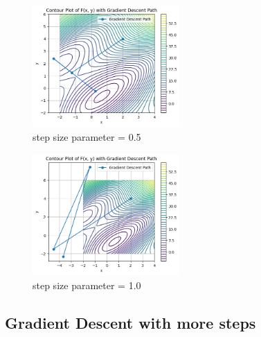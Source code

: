 \begin{multicols}{2} %
    \begin{figure}[H]
        \centering
        \includegraphics[width=0.5\textwidth]{pic/Gradient_Descent_Path_05.png}
        \caption{step size parameter = 0.5}
    \end{figure}
    \columnbreak
    \begin{figure}[H]
        \centering
        \includegraphics[width=0.5\textwidth]{pic/Gradient_Descent_Path_10.png}
        \caption{step size parameter = 1.0}
    \end{figure}
\end{multicols}


\subsection{Gradient Descent with more steps}
